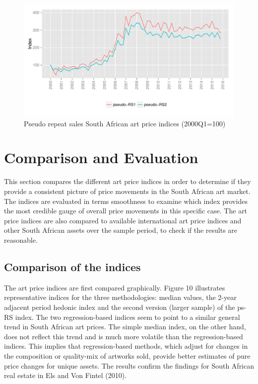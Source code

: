 \documentclass[12pt,]{article}
\begin{document}
\begin{figure}[htbp]
\centering
\includegraphics{Art_Price_Indices_3_files/figure-latex/figure9-1.pdf}
\caption{Pseudo repeat sales South African art price indices
(2000Q1=100)}
\end{figure}

\section{Comparison and Evaluation}\label{comparison-and-evaluation}

This section compares the different art price indices in order to
determine if they provide a consistent picture of price movements in the
South African art market. The indices are evaluated in terms smoothness
to examine which index provides the most credible gauge of overall price
movements in this specific case. The art price indices are also compared
to available international art price indices and other South African
assets over the sample period, to check if the results are reasonable.

\subsection{Comparison of the indices}\label{comparison-of-the-indices}

The art price indices are first compared graphically. Figure 10
illustrates representative indices for the three methodologies: median
values, the 2-year adjacent period hedonic index and the second version
(larger sample) of the ps-RS index. The two regression-based indices
seem to point to a similar general trend in South African art prices.
The simple median index, on the other hand, does not reflect this trend
and is much more volatile than the regression-based indices. This
implies that regression-based methods, which adjust for changes in the
composition or quality-mix of artworks sold, provide better estimates of
pure price changes for unique assets. The results confirm the findings
for South African real estate in Els and Von Fintel (2010).
\end{document}
